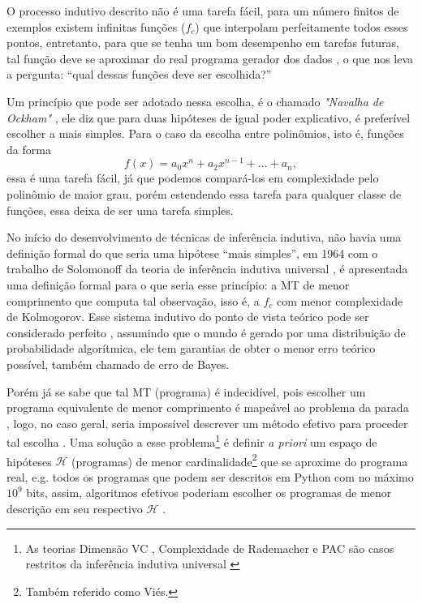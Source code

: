 O processo indutivo descrito não é uma tarefa fácil,
para um número finitos de exemplos existem infinitas funções ($f_c$) que
interpolam perfeitamente todos esses
pontos\cite{bishop2006pattern,abu2012learning}, entretanto, para que se tenha
um bom desempenho em tarefas futuras, tal função deve se aproximar do real
programa gerador dos dados
\cite{mohri2018foundations,goodfellow2016deep,solomonoff1964formal,kearns1994introduction},
o que nos leva a pergunta: ``qual dessas funções deve ser escolhida?''

Um princípio que pode ser adotado nessa escolha, é o chamado \textit{"Navalha
de Ockham"} \cite{blumer1987occam}, ele diz que para duas hipóteses de igual
poder explicativo, é preferível escolher a mais simples. Para o caso
da escolha entre polinômios, isto é, funções da forma
\[f(x) = a_0x^n+a_2x^{n-1}+...+a_n,\]
essa é uma tarefa fácil, já que podemos compará-los em complexidade pelo
polinômio de maior grau, porém estendendo essa tarefa para qualquer classe de
funções, essa deixa de ser uma tarefa simples.

No início do desenvolvimento de técnicas de inferência indutiva, não havia uma
definição formal do que seria uma hipótese ``mais simples'', em 1964 com o
trabalho de Solomonoff da teoria de inferência indutiva universal
\cite{solomonoff1964formal}, é apresentada uma definição formal para o que
seria esse princípio: a MT de menor comprimento que computa tal observação,
isso é, a $f_c$ com menor complexidade de Kolmogorov. Esse sistema indutivo do
ponto de vista teórico pode ser considerado perfeito \cite{li1992inductive},
assumindo que o mundo é gerado por uma distribuição de probabilidade
algorítmica, ele tem garantias de obter o menor erro teórico possível,
também chamado de erro de Bayes.

Porém já se sabe que tal MT (programa) é indecidível, pois escolher um
programa equivalente de menor comprimento é mapeável ao problema da parada
\cite{sipser2012introduction,solomonoff1978complexity}, logo, no caso geral,
seria impossível descrever um método efetivo para proceder tal escolha
\cite{hutter2004universal}. Uma solução a esse problema\footnote{As teorias
Dimensão VC \cite{vapnik2013nature}, Complexidade de Rademacher
\cite{bartlett2002rademacher} e PAC \cite{valiant1984theory} são casos
restritos da inferência indutiva universal
\cite{li1992inductive,blumer1989learnability}} é definir \textit{a priori} um
espaço de hipóteses $\mathcal{H}$ (programas) de menor
cardinalidade\footnote{Também referido como Viés.} que se aproxime do programa real, e.g. todos os programas que
podem ser descritos em Python com no máximo $10^9$ bits, assim, algoritmos
efetivos poderiam escolher os programas de menor descrição em seu respectivo
$\mathcal{H}$ \cite{rathmanner2011philosophical}.

